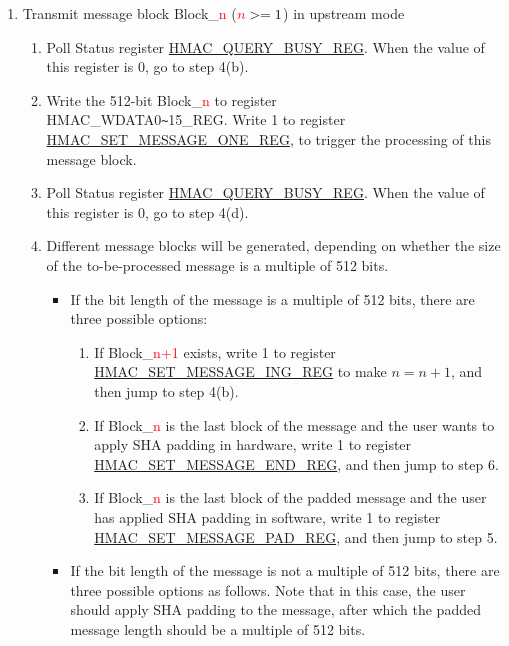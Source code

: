 \documentclass[main\_\_EN.tex]{subfiles}
\begin{document}
\begin{enumerate}
    \item Transmit message block Block\_\textcolor{red}{n} ($\textcolor{red}{n}>=1$) in upstream mode
    \begin{enumerate}
        \item Poll Status register \hyperref[regdesc:HMACQUERYBUSYREG]{HMAC\_QUERY\_BUSY\_REG}. When the value of this register is 0, go to step 4(b).
        \item Write the 512-bit Block\_\textcolor{red}{n} to register \\HMAC\_WDATA0\verb+~+15\_REG. Write 1 to register \hyperref[regdesc:HMACSETMESSAGEONEREG]{HMAC\_SET\_MESSAGE\_ONE\_REG}, to trigger the processing of this message block.
        \item Poll Status register \hyperref[regdesc:HMACQUERYBUSYREG]{HMAC\_QUERY\_BUSY\_REG}. When the value of this register is 0, go to step 4(d).
        \item Different message blocks will be generated, depending on whether the size of the to-be-processed message is a multiple of 512 bits.
        \begin{itemize}
            \item If the bit length of the message is a multiple of 512 bits, there are three possible options:
            \begin{enumerate}
                \item If Block\_\textcolor{red}{n+1} exists, write 1 to register \hyperref[regdesc:HMACSETMESSAGEINGREG]{HMAC\_SET\_MESSAGE\_ING\_REG} to make $n=n+1$, and then jump to step 4(b).
                \item If Block\_\textcolor{red}{n} is the last block of the message and the user wants to apply SHA padding in hardware, write 1 to register \hyperref[regdesc:HMACSETMESSAGEENDREG]{HMAC\_SET\_MESSAGE\_END\_REG}, and then jump to step 6.
                \item If Block\_\textcolor{red}{n} is the last block of the padded message and the user has applied SHA padding in software, write 1 to register \hyperref[regdesc:HMACSETMESSAGEPADREG]{HMAC\_SET\_MESSAGE\_PAD\_REG}, and then jump to step 5.
            \end{enumerate}
            \item If the bit length of the message is not a multiple of 512 bits, there are three possible options as follows. Note that in this case, the user should apply SHA padding to the message, after which the padded message length should be a multiple of 512 bits.
            \begin{enumerate}

\end{enumerate}
\end{itemize}
\end{enumerate}
\end{enumerate}
\end{document}
